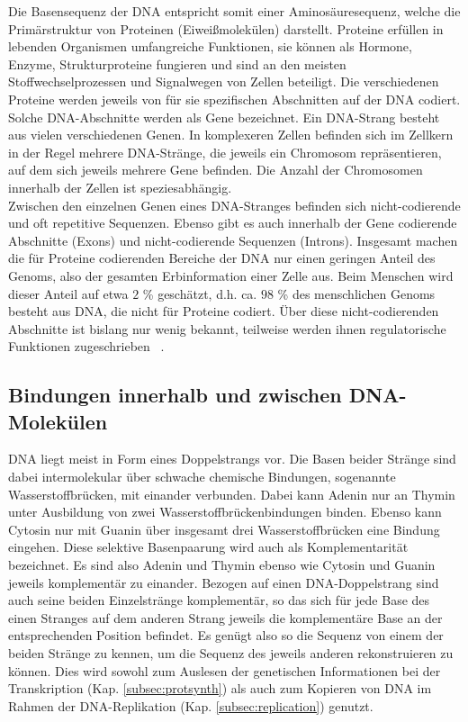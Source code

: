 Die Basensequenz der DNA entspricht somit einer Aminosäuresequenz, welche die Primärstruktur von Proteinen (Eiweißmolekülen) darstellt. Proteine erfüllen in lebenden Organismen umfangreiche Funktionen, sie können als Hormone, Enzyme, Strukturproteine fungieren und sind an den meisten Stoffwechselprozessen und Signalwegen von Zellen beteiligt. Die verschiedenen Proteine werden jeweils von für sie spezifischen Abschnitten auf der DNA codiert. Solche DNA-Abschnitte werden als Gene bezeichnet. Ein DNA-Strang besteht aus vielen verschiedenen Genen. In komplexeren Zellen befinden sich im Zellkern in der Regel mehrere DNA-Stränge, die jeweils ein Chromosom repräsentieren, auf dem sich jeweils mehrere Gene befinden. Die Anzahl der Chromosomen innerhalb der Zellen ist speziesabhängig. \\

Zwischen den einzelnen Genen eines DNA-Stranges befinden sich nicht-codierende und oft repetitive Sequenzen. Ebenso gibt es auch innerhalb der Gene codierende Abschnitte (Exons) und nicht-codierende Sequenzen (Introns). Insgesamt machen die für Proteine codierenden Bereiche der DNA nur einen geringen Anteil des Genoms, also der gesamten Erbinformation einer Zelle aus. Beim Menschen wird dieser Anteil auf etwa $2$ \% geschätzt, d.h. ca. $ 98 $ \% des menschlichen Genoms besteht aus DNA, die nicht für Proteine codiert. Über diese nicht-codierenden Abschnitte ist bislang nur wenig bekannt, teilweise werden ihnen regulatorische Funktionen zugeschrieben ~\cite{dunham_2012, tsagakis_2020}. \\

\subsection{Bindungen innerhalb und zwischen DNA-Molekülen} \label{subsec:double_strand}

DNA liegt meist in Form eines Doppelstrangs vor. Die Basen beider Stränge sind dabei intermolekular über schwache chemische Bindungen, sogenannte Wasserstoffbrücken, mit einander verbunden. Dabei kann Adenin nur an Thymin unter Ausbildung von zwei Wasserstoffbrückenbindungen binden. Ebenso kann Cytosin nur mit Guanin über insgesamt drei Wasserstoffbrücken eine Bindung eingehen. Diese selektive Basenpaarung wird auch als Komplementarität bezeichnet. Es sind also Adenin und Thymin ebenso wie Cytosin und Guanin jeweils komplementär zu einander. Bezogen auf einen DNA-Doppelstrang sind auch seine beiden Einzelstränge komplementär, so das sich für jede Base des einen Stranges auf dem anderen Strang jeweils die komplementäre Base an der entsprechenden Position befindet. Es genügt also so die Sequenz von einem der beiden Stränge zu kennen, um die Sequenz des jeweils anderen rekonstruieren zu können. Dies wird sowohl zum Auslesen der genetischen Informationen bei der Transkription (Kap. \ref{subsec:protsynth}) als auch zum Kopieren von DNA im Rahmen der DNA-Replikation (Kap. \ref{subsec:replication}) genutzt. \\

